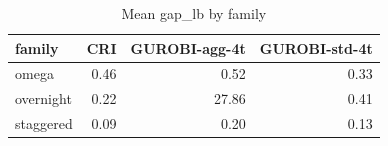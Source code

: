 \begin{table}[htbp]
\centering
\small
\caption{Mean gap\_lb by family}
\label{tab:E7_gurobi_threads_b10_by_family}
\begin{tabular}{lrrr}
\toprule
family & CRI & GUROBI-agg-4t & GUROBI-std-4t \\
\midrule
omega & 0.46 & 0.52 & 0.33 \\
overnight & 0.22 & 27.86 & 0.41 \\
staggered & 0.09 & 0.20 & 0.13 \\
\bottomrule
\end{tabular}
\end{table}
